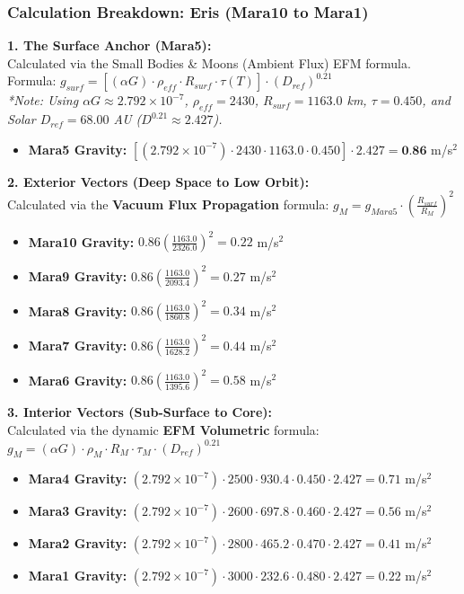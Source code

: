 \documentclass[11pt, a4paper]{article}
\begin{document}
\clearpage
\subsubsection{Calculation Breakdown: Eris (Mara10 to Mara1)}

\noindent \textbf{1. The Surface Anchor (Mara5):} \\
Calculated via the Small Bodies \& Moons (Ambient Flux) EFM formula. \\
Formula: $g_{surf} = \left[ (\alpha G) \cdot \rho_{eff} \cdot R_{surf} \cdot \tau(T) \right] \cdot (D_{ref})^{0.21}$ \\
\textit{*Note: Using $\alpha G \approx 2.792 \times 10^{-7}$, $\rho_{eff} = 2430$, $R_{surf} = 1163.0$ km, $\tau = 0.450$, and Solar $D_{ref} = 68.00$ AU ($D^{0.21} \approx 2.427$).}
\begin{itemize}
  \item \textbf{Mara5 Gravity:} $\left[ (2.792 \times 10^{-7}) \cdot 2430 \cdot 1163.0 \cdot 0.450 \right] \cdot 2.427 = \textbf{0.86}$ m/s$^2$
\end{itemize}

\vspace{0.5em}
\noindent \textbf{2. Exterior Vectors (Deep Space to Low Orbit):} \\
Calculated via the \textbf{Vacuum Flux Propagation} formula: $g_M = g_{Mara5} \cdot \left( \frac{R_{surf}}{R_M} \right)^2$
\begin{itemize}
  \item \textbf{Mara10 Gravity:} $0.86 \left( \frac{1163.0}{2326.0} \right)^2 = 0.22$ m/s$^2$
  \item \textbf{Mara9 Gravity:} $0.86 \left( \frac{1163.0}{2093.4} \right)^2 = 0.27$ m/s$^2$
  \item \textbf{Mara8 Gravity:} $0.86 \left( \frac{1163.0}{1860.8} \right)^2 = 0.34$ m/s$^2$
  \item \textbf{Mara7 Gravity:} $0.86 \left( \frac{1163.0}{1628.2} \right)^2 = 0.44$ m/s$^2$
  \item \textbf{Mara6 Gravity:} $0.86 \left( \frac{1163.0}{1395.6} \right)^2 = 0.58$ m/s$^2$
\end{itemize}

\vspace{0.5em}
\noindent \textbf{3. Interior Vectors (Sub-Surface to Core):} \\
Calculated via the dynamic \textbf{EFM Volumetric} formula: $g_M = (\alpha G) \cdot \rho_{M} \cdot R_M \cdot \tau_M \cdot (D_{ref})^{0.21}$
\begin{itemize}
  \item \textbf{Mara4 Gravity:} $(2.792 \times 10^{-7}) \cdot 2500 \cdot 930.4 \cdot 0.450 \cdot 2.427 = 0.71$ m/s$^2$
  \item \textbf{Mara3 Gravity:} $(2.792 \times 10^{-7}) \cdot 2600 \cdot 697.8 \cdot 0.460 \cdot 2.427 = 0.56$ m/s$^2$
  \item \textbf{Mara2 Gravity:} $(2.792 \times 10^{-7}) \cdot 2800 \cdot 465.2 \cdot 0.470 \cdot 2.427 = 0.41$ m/s$^2$
  \item \textbf{Mara1 Gravity:} $(2.792 \times 10^{-7}) \cdot 3000 \cdot 232.6 \cdot 0.480 \cdot 2.427 = 0.22$ m/s$^2$
\end{itemize}
\end{document}
